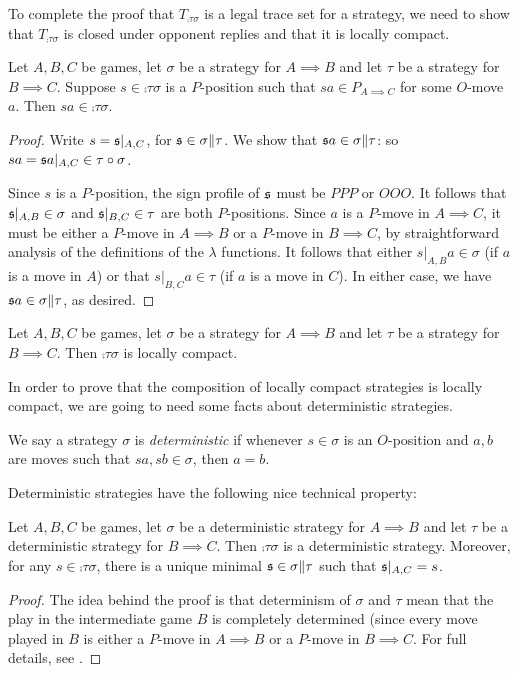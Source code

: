 \documentclass{article}
\begin{document}
To complete the proof that $T_{\comp\tau\sigma}$ is a legal trace set for a strategy, we need to show that $T_{\comp\tau\sigma}$ is closed under opponent replies and that it is locally compact.

\begin{proposition}
  Let $A,B,C$ be games, let $\sigma$ be a strategy for $A\implies B$ and let $\tau$ be a strategy for $B\implies C$.  Suppose $s\in\comp\tau\sigma$ is a $P$-position such that $sa\in P_{A\implies C}$ for some $O$-move $a$.  Then $sa\in\comp\tau\sigma$.

  \begin{proof}
    Write $s=\mathfrak s\vert_{A,C}$, for $\mathfrak s\in\sigma\|\tau$.  We show that $\mathfrak s a\in\sigma\|\tau$: so $sa = \mathfrak s a\vert_{A,C}\in\tau \circ \sigma$.  

    Since $s$ is a $P$-position, the sign profile of $\mathfrak s$ must be $PPP$ or $OOO$.  It follows that $\mathfrak s\vert_{A,B}\in\sigma$ and $\mathfrak s\vert_{B,C}\in\tau$ are both $P$-positions.  Since $a$ is a $P$-move in $A\implies C$, it must be either a $P$-move in $A\implies B$ or a $P$-move in $B\implies C$, by straightforward analysis of the definitions of the $\lambda$ functions.  It follows that either $s\vert_{A,B}a\in\sigma$ (if $a$ is a move in $A$) or that $s\vert_{B,C}a\in\tau$ (if $a$ is a move in $C$).  In either case, we have $\mathfrak s a\in\sigma\|\tau$, as desired.
  \end{proof}
\end{proposition}

\begin{proposition}\label{locallyCompactComposition}
  Let $A,B,C$ be games, let $\sigma$ be a strategy for $A\implies B$ and let $\tau$ be a strategy for $B\implies C$.  Then $\comp\tau\sigma$ is locally compact.
\end{proposition}

In order to prove that the composition of locally compact strategies is locally compact, we are going to need some facts about deterministic strategies.

\begin{definition}
  We say a strategy $\sigma$ is \emph{deterministic} if whenever $s\in\sigma$ is an $O$-position and $a,b$ are moves such that $sa,sb\in\sigma$, then $a=b$.
\end{definition}

Deterministic strategies have the following nice technical property:

\begin{proposition}
  Let $A,B,C$ be games, let $\sigma$ be a deterministic strategy for $A\implies B$ and let $\tau$ be a deterministic strategy for $B\implies C$.  Then $\comp\tau\sigma$ is a deterministic strategy.  Moreover, for any $s\in\comp\tau\sigma$, there is a unique minimal $\mathfrak s\in\sigma\|\tau$ such that $\mathfrak s\vert_{A,C}=s$.
  \begin{proof}
    The idea behind the proof is that determinism of $\sigma$ and $\tau$ mean that the play in the intermediate game $B$ is completely determined (since every move played in $B$ is either a $P$-move in $A\implies B$ or a $P$-move in $B\implies C$.  For full details, see \cite{abramskyjagadeesangames}.
  \end{proof}
\end{proposition}
\end{document}
